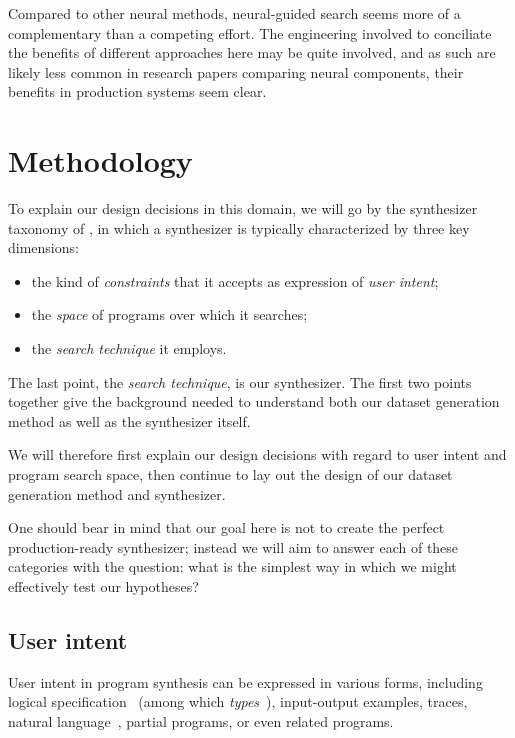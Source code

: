 \documentclass{article}
\begin{document}
Compared to other neural methods, neural-guided search seems
more of a complementary than a competing effort.
The engineering involved to conciliate the benefits of
different approaches here may be quite involved, and as such
are likely less common in research papers comparing neural components,
their benefits in production systems seem clear.


\section{Methodology} %

To explain our design decisions in this domain,
we will go by the synthesizer taxonomy of \citet{gulwani2017program},
in which a synthesizer is typically characterized by three key dimensions:
\begin{itemize}
    \item the kind of \emph{constraints} that it accepts as expression of \emph{user intent};
    \item the \emph{space} of programs over which it searches;
    \item the \emph{search technique} it employs.
\end{itemize}

The last point, the \emph{search technique}, is our synthesizer.
The first two points together give the background needed to understand both our dataset generation method as well as the synthesizer itself.

We will therefore first explain our design decisions with regard to user intent and program search space,
then continue to lay out the design of our dataset generation method and synthesizer.

One should bear in mind that our goal here is not to create the perfect production-ready synthesizer;
instead we will aim to answer each of these categories with the question:
what is the simplest way in which we might effectively test our hypotheses?

\subsection{User intent}

User intent in program synthesis can be expressed in various forms, including logical specification~\citep{temporalstreamlogic} (among which \emph{types}~\citep{synquid}),
input-output examples, traces, natural language~\citep{abstractsyntaxnetworks},
partial programs, or even related programs.~\citep{gulwani2017program}
\end{document}
